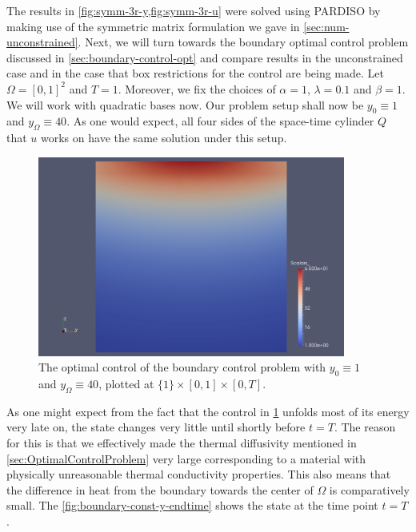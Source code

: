 \documentclass[../thesis.tex]{subfiles}
\begin{document}
The results in \cref{fig:symm-3r-y,fig:symm-3r-u} were solved using PARDISO by making use of the symmetric matrix formulation we gave in \cref{sec:num-unconstrained}.
\FloatBarrier
Next, we will turn towards the boundary optimal control problem discussed in \cref{sec:boundary-control-opt} and compare results in the unconstrained case and in the case that box restrictions for the control are being made.
Let $\Omega = [0, 1]^2$ and $T = 1$. Moreover, we fix the choices of $\alpha = 1$, $\lambda = 0.1$ and $\beta = 1$.
We will work with quadratic bases now.
Our problem setup shall now be $y_0 \equiv 1$ and $y_\Omega \equiv 40$.
As one would expect, all four sides of the space-time cylinder $Q$ that $u$ works on have the same solution under this setup.
\begin{figure}[htpb]
\centering
\includegraphics[width=0.9\textwidth]{Images/boundary-const-u.png}
\caption{The optimal control of the boundary control problem with $y_0 \equiv 1$ and $y_\Omega \equiv 40$, plotted at $\{ 1 \} \times [0, 1] \times [0, T]$.}
\label{fig:boundary-const-u}
\end{figure}
As one might expect from the fact that the control in \cref{fig:boundary-const-u} unfolds most of its energy very late on, the state changes very little until shortly before $t = T$. The reason for this is that we effectively made the thermal diffusivity mentioned in \cref{sec:OptimalControlProblem} very large corresponding to a material with physically unreasonable thermal conductivity properties.
This also means that the difference in heat from the boundary towards the center of $\Omega$ is comparatively small.
The \cref{fig:boundary-const-y-endtime} shows the state at the time point $t = T$.
\end{document}
